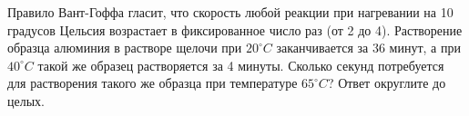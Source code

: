 
Правило
Вант-Гоффа гласит, что скорость любой реакции при нагревании на 10 градусов
Цельсия возрастает в фиксированное число раз (от 2 до 4). Растворение образца
алюминия в растворе щелочи при $20^{\circ} C$ заканчивается за 36 минут, а при $40^{\circ} C$ такой 
же образец растворяется за 4 минуты. Сколько секунд потребуется для растворения 
такого же образца при температуре $65^{\circ} C$?
Ответ округлите до целых.



